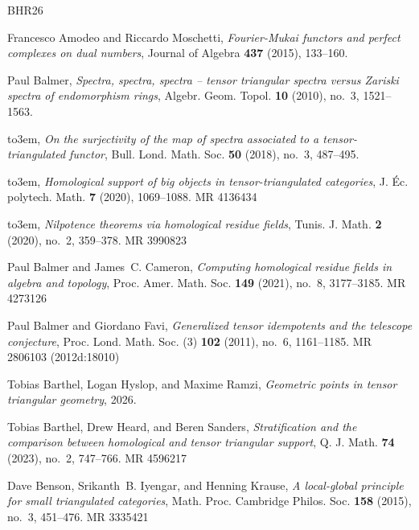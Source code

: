 \documentclass[11pt]{amsart}
\numberwithin{equation}{section} %
\theoremstyle{plain}
\theoremstyle{definition}
\theoremstyle{remark}
\begin{document}
\providecommand{\bysame}{\leavevmode\hbox to3em{\hrulefill}\thinspace}
\providecommand{\MR}{\relax\ifhmode\unskip\space\fi MR }
\providecommand{\MRhref}[2]{%
  \href{http://www.ams.org/mathscinet-getitem?mr=#1}{#2}
}
\providecommand{\href}[2]{#2}
\begin{thebibliography}{BHR26}

Francesco Amodeo and Riccardo Moschetti, \emph{{F}ourier-{M}ukai functors and perfect complexes on dual numbers}, Journal of Algebra \textbf{437} (2015), 133--160.

Paul Balmer, \emph{Spectra, spectra, spectra -- tensor triangular spectra versus {Z}ariski spectra of endomorphism rings}, Algebr. Geom. Topol. \textbf{10} (2010), no.~3, 1521--1563.

\bysame, \emph{On the surjectivity of the map of spectra associated to a tensor-triangulated functor}, Bull. Lond. Math. Soc. \textbf{50} (2018), no.~3, 487--495.

\bysame, \emph{Homological support of big objects in tensor-triangulated categories}, J. \'{E}c. polytech. Math. \textbf{7} (2020), 1069--1088. \MR{4136434}

\bysame, \emph{Nilpotence theorems via homological residue fields}, Tunis. J. Math. \textbf{2} (2020), no.~2, 359--378. \MR{3990823}

Paul Balmer and James~C. Cameron, \emph{Computing homological residue fields in algebra and topology}, Proc. Amer. Math. Soc. \textbf{149} (2021), no.~8, 3177--3185. \MR{4273126}

Paul Balmer and Giordano Favi, \emph{Generalized tensor idempotents and the telescope conjecture}, Proc. Lond. Math. Soc. (3) \textbf{102} (2011), no.~6, 1161--1185. \MR{2806103 (2012d:18010)}

Tobias Barthel, Logan Hyslop, and Maxime Ramzi, \emph{Geometric points in tensor triangular geometry}, 2026.

Tobias Barthel, Drew Heard, and Beren Sanders, \emph{Stratification and the comparison between homological and tensor triangular support}, Q. J. Math. \textbf{74} (2023), no.~2, 747--766. \MR{4596217}

Dave Benson, Srikanth~B. Iyengar, and Henning Krause, \emph{A local-global principle for small triangulated categories}, Math. Proc. Cambridge Philos. Soc. \textbf{158} (2015), no.~3, 451--476. \MR{3335421}


\end{thebibliography}
\end{document}
